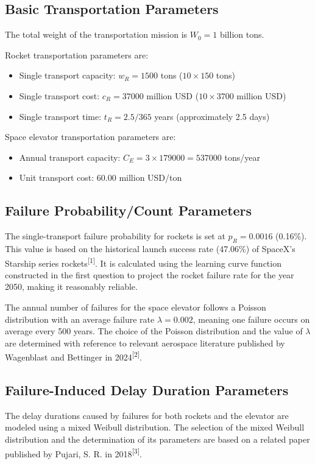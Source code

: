 \documentclass{article}
\begin{document}
\subsection{Basic Transportation Parameters}
The total weight of the transportation mission is $W_0 = 1$ billion tons.

Rocket transportation parameters are:
\begin{itemize}
    \item Single transport capacity: $w_R = 1500$ tons ($10 \times 150$ tons)
    \item Single transport cost: $c_R = 37000$ million USD ($10 \times 3700$ million USD)
    \item Single transport time: $t_R = 2.5/365$ years (approximately 2.5 days)
\end{itemize}

Space elevator transportation parameters are:
\begin{itemize}
    \item Annual transport capacity: $C_E = 3 \times 179000 = 537000$ tons/year
    \item Unit transport cost: $60.00$ million USD/ton
\end{itemize}

\subsection{Failure Probability/Count Parameters}
The single-transport failure probability for rockets is set at $p_R = 0.0016$ (0.16\%). This value is based on the historical launch success rate (47.06\%) of SpaceX's Starship series rockets\textsuperscript{[1]}. It is calculated using the learning curve function constructed in the first question to project the rocket failure rate for the year 2050, making it reasonably reliable.

The annual number of failures for the space elevator follows a Poisson distribution with an average failure rate $\lambda = 0.002$, meaning one failure occurs on average every 500 years. The choice of the Poisson distribution and the value of $\lambda$ are determined with reference to relevant aerospace literature published by Wagenblast and Bettinger in 2024\textsuperscript{[2]}.

\subsection{Failure-Induced Delay Duration Parameters}
The delay durations caused by failures for both rockets and the elevator are modeled using a mixed Weibull distribution. The selection of the mixed Weibull distribution and the determination of its parameters are based on a related paper published by Pujari, S. R. in 2018\textsuperscript{[3]}.
\end{document}
